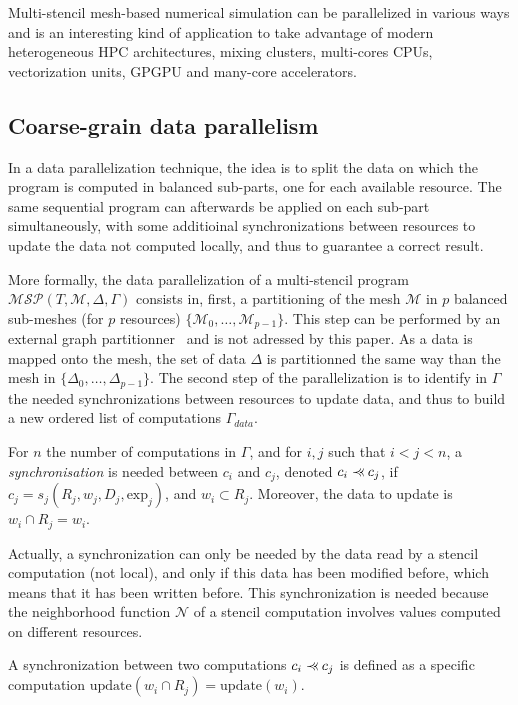 Multi-stencil mesh-based numerical simulation can be parallelized in various ways and is an interesting kind of application to take advantage of modern heterogeneous HPC architectures, mixing clusters, multi-cores CPUs, vectorization units, GPGPU and many-core accelerators.

\subsection{Coarse-grain data parallelism}
In a data parallelization technique, the idea is to split the data on which the program is computed in balanced sub-parts, one for each available resource. The same sequential program can afterwards be applied on each sub-part simultaneously, with some additioinal synchronizations between resources to update the data not computed locally, and thus to guarantee a correct result.

More formally, the data parallelization of a multi-stencil program $\mathcal{MSP}(T,\mathcal{M},\Delta,\Gamma)$ consists in, first, a partitioning of the mesh $\mathcal{M}$ in $p$ balanced sub-meshes (for $p$ resources) $\{\mathcal{M}_0,\dots,\mathcal{M}_{p-1}\}$. This step can be performed by an external graph partitionner~\cite{} and is not adressed by this paper. As a data is mapped onto the mesh, the set of data $\Delta$ is partitionned the same way than the mesh in $\{\Delta_0,\dots,\Delta_{p-1}\}$. The second step of the parallelization is to identify in $\Gamma$ the needed synchronizations between resources to update data, and thus to build a new ordered list of computations $\Gamma_{data}$.

\begin{mydef}
For $n$ the number of computations in $\Gamma$, and for $i,j$ such that $i<j<n$, a \textit{synchronisation} is needed between $c_i$ and $c_j$, denoted $c_i \pprec c_j$, if $c_j=s_j(R_j,w_j,D_j,\text{exp}_j)$, and $w_i \subset R_j$. Moreover, the data to update is $w_i \cap R_j = w_i$.
\end{mydef}

Actually, a synchronization can only be needed by the data read by a stencil computation (not local), and only if this data has been modified before, which means that it has been written before. This synchronization is needed because the neighborhood function $\mathcal{N}$ of a stencil computation involves values computed on different resources.

\begin{mydef}
A synchronization between two computations $c_i \pprec c_j$ is defined as a specific computation $\text{update}(w_i \cap R_j)=\text{update}(w_i)$.
\end{mydef}

